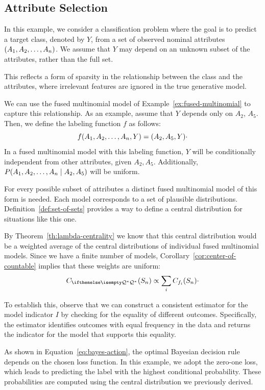 \subsection{Attribute Selection}\label{subsec:attribute-selection}

In this example, we consider a classification problem where the goal is to
predict a target class, denoted by $Y$, from a set of observed nominal attributes $(A_1, A_2, \ldots, A_{n})$.
We assume that $Y$ may depend on an unknown subset of the attributes, rather than the full set.

This reflects a form of sparsity in the relationship between the class and the attributes, where irrelevant
features are ignored in the true generative model.

We can use the fused multinomial model of Example~\ref{ex:fused-multinomial} to capture this relationship.
As an example, assume that $Y$ depends only on $A_2$, $A_5$.
Then, we define the labeling function $f$ as follows:
\[
    f(A_1, A_2, \ldots, A_{n}, Y) = (A_2, A_5, Y) \cdot
\]
In a fused multinomial model with this labeling function, $Y$ will be conditionally independent
from other attributes, given $A_2, A_5$.
Additionally, $P(A_1, A_2, \ldots, A_{n} \mid A_2, A_5)$ will be uniform.

For every possible subset of attributes a distinct fused multinomial model of this form is needed.
Each model corresponds to a set of plausible distributions.
Definition~\ref{def:set-of-sets} provides a way to define a central distribution for situations like this one.

By Theorem~\ref{th:lambda-centrality} we know that this central distribution would be a weighted average of
the central distributions of individual fused multinomial models.
Since we have a finite number of models, Corollary~\ref{cor:center-of-countable} implies that these weights
are uniform:
\[
    C_{\setQQ}(S_n) \propto \sum_i C_{f_i}(S_n) \cdot
\]

To establish this, observe that we can construct a consistent estimator for the model indicator $I$ by checking
for the equality of different outcomes.
Specifically, the estimator identifies outcomes with equal frequency in the data and returns the indicator for
the model that supports this equality.

As shown in Equation~\ref{eq:bayes-action}, the optimal Bayesian decision rule depends on the chosen loss function.
In this example, we adopt the zero-one loss, which leads to predicting the label with the highest conditional
probability.
These probabilities are computed using the central distribution we previously derived.

